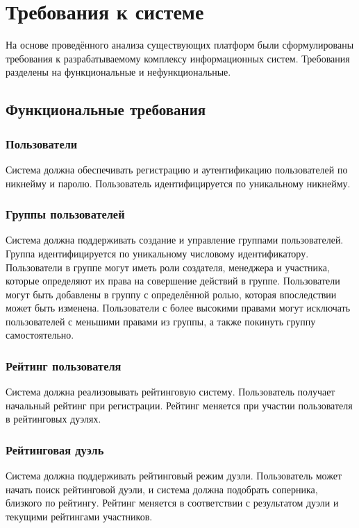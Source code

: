 \section{Требования к системе}

На основе проведённого анализа существующих платформ были сформулированы требования к
разрабатываемому комплексу информационных систем.
Требования разделены на функциональные и нефункциональные.

\subsection{Функциональные требования}

\subsubsection*{Пользователи}
Система должна обеспечивать регистрацию и аутентификацию пользователей по никнейму и паролю.
Пользователь идентифицируется по уникальному никнейму.

\subsubsection*{Группы пользователей}
Система должна поддерживать создание и управление группами пользователей.
Группа идентифицируется по уникальному числовому идентификатору.
Пользователи в группе могут иметь роли создателя, менеджера и участника,
которые определяют их права на совершение действий в группе.
Пользователи могут быть добавлены в группу с определённой ролью, которая впоследствии может быть изменена.
Пользователи с более высокими правами могут исключать пользователей с меньшими правами из группы,
а также покинуть группу самостоятельно.

\subsubsection*{Рейтинг пользователя}
Система должна реализовывать рейтинговую систему.
Пользователь получает начальный рейтинг при регистрации.
Рейтинг меняется при участии пользователя в рейтинговых дуэлях.

\subsubsection*{Рейтинговая дуэль}
Система должна поддерживать рейтинговый режим дуэли.
Пользователь может начать поиск рейтинговой дуэли,
и система должна подобрать соперника, близкого по рейтингу.
Рейтинг меняется в соответствии с результатом дуэли и текущими рейтингами участников.

